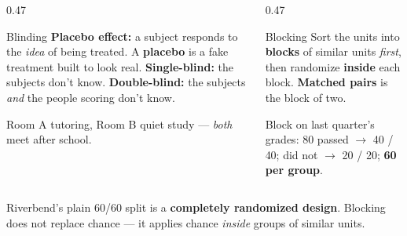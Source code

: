 \documentclass[aspectratio=169, 11pt]{beamer}
\begin{document}
\begin{frame}[t, plain]
  \vspace{4pt}
  \begin{columns}[t]
    \begin{column}{0.47\textwidth}
      \begin{block}{Blinding}
        \textbf{Placebo effect:} a subject responds to the \emph{idea} of being treated.
        A \textbf{placebo} is a fake treatment built to look real.
        \textbf{Single-blind:} the subjects don't know. \textbf{Double-blind:} the subjects
        \emph{and} the people scoring don't know.
      \end{block}
      \vspace{3pt}
      {\small Room A tutoring, Room B quiet study --- \emph{both} meet after school.}
    \end{column}
    \begin{column}{0.47\textwidth}
      \begin{block}{Blocking}
        Sort the units into \textbf{blocks} of similar units \emph{first}, then randomize
        \textbf{inside} each block. \textbf{Matched pairs} is the block of two.
      \end{block}
      \vspace{3pt}
      {\small Block on last quarter's grades: 80 passed $\to$ 40 / 40;  did not $\to$
      20 / 20; \quad \textbf{60 per group}.}
    \end{column}
  \end{columns}
  \vspace{10pt}
  \begin{center}
    {\small\color{slate} Riverbend's plain 60/60 split is a \textbf{completely randomized
    design}. Blocking does not replace chance --- it applies chance \emph{inside} groups of
    similar units.}
  \end{center}
\end{frame}
\end{document}
